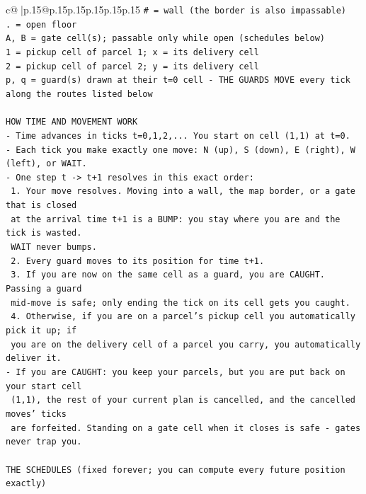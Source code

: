 \documentclass{article}
\begin{document}
{\begin{supertabular}{c@{$\;$}|p{.15\linewidth}@{}p{.15\linewidth}p{.15\linewidth}p{.15\linewidth}p{.15\linewidth}p{.15\linewidth}}
{{{\texttt{\# = wall (the border is also impassable)} \\
\texttt{. = open floor} \\
\texttt{A, B = gate cell(s); passable only while open (schedules below)} \\
\texttt{1 = pickup cell of parcel 1; x = its delivery cell} \\
\texttt{2 = pickup cell of parcel 2; y = its delivery cell} \\
\texttt{p, q = guard(s) drawn at their t=0 cell {-} THE GUARDS MOVE every tick along the routes listed below} \\
\\ 
\texttt{HOW TIME AND MOVEMENT WORK} \\
\texttt{{-} Time advances in ticks t=0,1,2,... You start on cell (1,1) at t=0.} \\
\texttt{{-} Each tick you make exactly one move: N (up), S (down), E (right), W (left), or WAIT.} \\
\texttt{{-} One step t {-}> t+1 resolves in this exact order:} \\
\texttt{  1. Your move resolves. Moving into a wall, the map border, or a gate that is closed} \\
\texttt{     at the arrival time t+1 is a BUMP: you stay where you are and the tick is wasted.} \\
\texttt{     WAIT never bumps.} \\
\texttt{  2. Every guard moves to its position for time t+1.} \\
\texttt{  3. If you are now on the same cell as a guard, you are CAUGHT. Passing a guard} \\
\texttt{     mid{-}move is safe; only ending the tick on its cell gets you caught.} \\
\texttt{  4. Otherwise, if you are on a parcel's pickup cell you automatically pick it up; if} \\
\texttt{     you are on the delivery cell of a parcel you carry, you automatically deliver it.} \\
\texttt{{-} If you are CAUGHT: you keep your parcels, but you are put back on your start cell} \\
\texttt{  (1,1), the rest of your current plan is cancelled, and the cancelled moves' ticks} \\
\texttt{  are forfeited. Standing on a gate cell when it closes is safe {-} gates never trap you.} \\
\\ 
\texttt{THE SCHEDULES (fixed forever; you can compute every future position exactly)} \\
}}}
\end{supertabular}}
\end{document}

